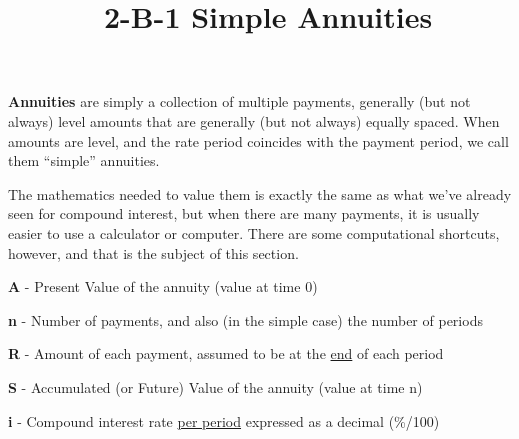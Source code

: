 \documentclass[12pt]{article}
\title{\normalfont\ 2-B-1 Simple Annuities} %
\author{} %
\date{}  %
\begin{document}
\maketitle %

\vspace{-1in}

\begin{flushleft}
    \textbf{Annuities} are simply a collection of multiple payments, generally (but not always)
    level amounts that are generally (but not always) equally spaced.  When amounts are level, and
    the rate period coincides with the payment period, we call them ``simple'' annuities.
\end{flushleft}

\begin{flushleft}
    The mathematics needed to value them is exactly the same as what we've already seen for compound interest,
    but when there are many payments, it is usually easier to use a calculator or computer.  There are some
    computational shortcuts, however, and that is the subject of this section.
\end{flushleft}
\vspace{.1in}

\begin{description}
    \item\textbf{A} - Present Value of the annuity (value at time 0)
    \item\textbf{n} - Number of payments, and also (in the simple case) the number of periods
    \item \textbf{R} - Amount of each payment, assumed to be at the \underline{end} of each period
    \item\textbf{S} - Accumulated (or Future) Value of the annuity (value at time n)
    \item\textbf{i} - Compound interest rate \underline{per period} expressed as a decimal {(\%/100)}

\end{description}
\vspace{.1in}
\end{document}
